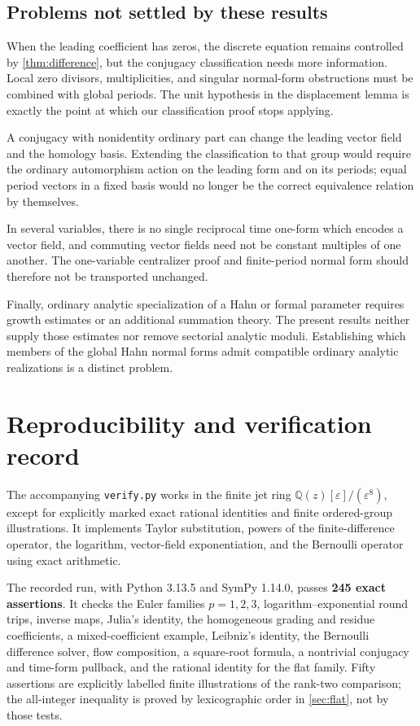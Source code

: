\documentclass[11pt,a4paper]{article}
\numberwithin{equation}{section}
\theoremstyle{definition}
\theoremstyle{remark}
\newcommand{\Q}{\mathbb Q}
\newcommand{\eps}{\varepsilon}
\begin{document}
\subsection{Problems not settled by these results}

When the leading coefficient has zeros, the discrete equation remains
controlled by \cref{thm:difference}, but the conjugacy classification needs
more information.  Local zero divisors, multiplicities, and singular
normal-form obstructions must be combined with global periods.  The unit
hypothesis in the displacement lemma is exactly the point at which our
classification proof stops applying.

A conjugacy with nonidentity ordinary part can change the leading vector
field and the homology basis.  Extending the classification to that group
would require the ordinary automorphism action on the leading form and on
its periods; equal period vectors in a fixed basis would no longer be the
correct equivalence relation by themselves.

In several variables, there is no single reciprocal time one-form which
encodes a vector field, and commuting vector fields need not be constant
multiples of one another.  The one-variable centralizer proof and
finite-period normal form should therefore not be transported unchanged.

Finally, ordinary analytic specialization of a Hahn or formal parameter
requires growth estimates or an additional summation theory.  The present
results neither supply those estimates nor remove sectorial analytic
moduli.  Establishing which members of the global Hahn normal forms admit
compatible ordinary analytic realizations is a distinct problem.

\section{Reproducibility and verification record}
\label{sec:verification}

The accompanying \texttt{verify.py} works in the finite jet ring
$\Q(z)[\eps]/(\eps^8)$, except for explicitly marked exact rational
identities and finite ordered-group illustrations.  It implements Taylor
substitution, powers of the finite-difference operator, the logarithm,
vector-field exponentiation, and the Bernoulli operator using exact
arithmetic.

The recorded run, with Python 3.13.5 and SymPy 1.14.0, passes
\textbf{245 exact assertions}.  It checks the Euler families $p=1,2,3$,
logarithm--exponential round trips, inverse maps, Julia's identity, the
homogeneous grading and residue coefficients, a mixed-coefficient example,
Leibniz's identity, the Bernoulli difference solver, flow composition, a
square-root formula, a nontrivial conjugacy and time-form pullback, and
the rational identity for the flat family.  Fifty assertions are explicitly
labelled finite illustrations of the rank-two comparison; the all-integer
inequality is proved by lexicographic order in \cref{sec:flat}, not by
those tests.
\end{document}
